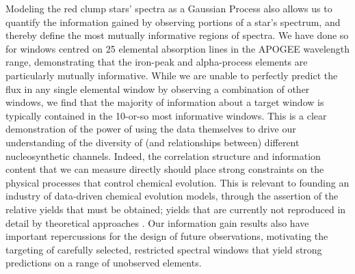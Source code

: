 \documentclass[a4paper,fleqn,usenatbib]{mnras}
\newcommand{\mkn}[1]{\textbf{\textcolor{red}{MKN: #1}}}
\begin{document}


Modeling the red clump stars' spectra as a Gaussian Process also allows us to quantify the information gained by observing portions of a star's spectrum, and thereby define the most mutually informative regions of spectra. We have done so for windows centred on 25 elemental absorption lines in the APOGEE wavelength range, demonstrating that the iron-peak and alpha-process elements are particularly mutually informative. While we are unable to perfectly predict the flux in any single elemental window by observing a combination of other windows, we find that the majority of information about a target window is typically contained in the 10-or-so most informative windows. This is a clear demonstration of the power of using the data themselves to drive our understanding of the diversity of (and relationships between) different nucleosynthetic channels. Indeed, the correlation structure and information content that we can measure directly should place strong constraints on the physical processes that control chemical evolution. This is relevant to founding an industry of data-driven chemical evolution models, through the assertion of the relative yields that must be obtained; yields that are currently not reproduced in detail by theoretical approaches \citep[e.g.][]{Jan2017, Blancato2019}. Our information gain results also have important repercussions for the design of future observations, motivating the targeting of carefully selected, restricted spectral windows that yield strong predictions on a range of unobserved elements.
\end{document}
